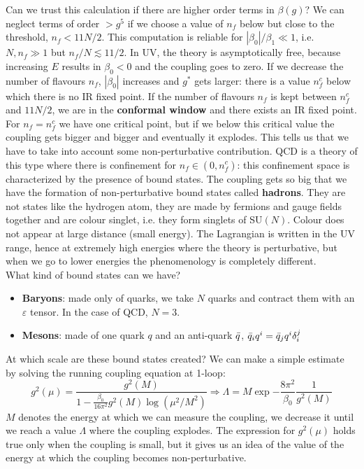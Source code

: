 \documentclass[../main.tex]{subfiles}
\begin{document}
Can we trust this calculation if there are higher order terms in $\beta(g)$? We can neglect terms of order $>g^5$ if we choose a value of $n_f$ below but close to the threshold, $n_f<11N/2$. This computation is reliable for $|\beta_0|/\beta_1\ll1$, i.e. $N,n_f\gg1$ but $n_f/N\lesssim11/2$. In UV, the theory is asymptotically free, because increasing $E$ results in $\beta_0<0$ and the coupling goes to zero. If we decrease the number of flavours $n_f$, $|\beta_0|$ increases and $g^*$ gets larger: there is a value $n_f^c$ below which there is no IR fixed point. If the number of flavours $n_f$ is kept between $n_f^c$ and $11N/2$, we are in the \textbf{conformal window} and there exists an IR fixed point. For $n_f=n_f^c$ we have one critical point, but if we below this critical value the coupling gets bigger and bigger and eventually it explodes. This tells us that we have to take into account some non-perturbative contribution. QCD is a theory of this type where there is confinement for $n_f\in(0,n_f^c)$: this confinement space is characterized by the presence of bound states. The coupling gets so big that we have the formation of non-perturbative bound states called \textbf{hadrons}. They are not states like the hydrogen atom, they are made by fermions and gauge fields together and are colour singlet, i.e. they form singlets of SU$(N)$. Colour does not appear at large distance (small energy). The Lagrangian is written in the UV range, hence at extremely high energies where the theory is perturbative, but when we go to lower energies the phenomenology is completely different.\\
What kind of bound states can we have?
\begin{itemize}
    \item \textbf{Baryons}: made only of quarks, we take $N$ quarks and contract them with an $\varepsilon$ tensor. In the case of QCD, $N=3$.
    \item \textbf{Mesons}: made of one quark $q$ and an anti-quark $\Bar{q}$, $\Bar{q}_iq^i=\Bar{q}_jq^i\delta_i^j$
\end{itemize}
At which scale are these bound states created? We can make a simple estimate by solving the running coupling equation at 1-loop:
\[
g^2(\mu)=\frac{g^2(M)}{1-\frac{\beta_0}{16\pi^2}g^2(M)\log(\mu^2/M^2)}\Rightarrow\Lambda=M\exp{-\frac{8\pi^2}{\beta_0}\frac{1}{g^2(M)}}
\]
$M$ denotes the energy at which we can measure the coupling, we decrease it until we reach a value $\Lambda$ where the coupling explodes. The expression for $g^2(\mu)$ holds true only when the coupling is small, but it gives us an idea of the value of the energy at which the coupling becomes non-perturbative.
\end{document}
